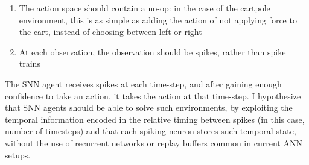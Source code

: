 \documentclass[fyp]{socreport}
\begin{document}
\begin{enumerate}
  \item The action space should contain a no-op: in the case of the cartpole
  environment, this is as simple as adding the action of not applying force to
  the cart, instead of choosing between left or right
\item At each observation, the observation should be spikes, rather than spike
trains
\end{enumerate}

The SNN agent receives spikes at each time-step, and after gaining enough
confidence to take an action, it takes the action at that time-step. I
hypothesize that SNN agents should be able to solve such environments, by
exploiting the temporal information encoded in the relative timing between
spikes (in this case, number of timesteps) and that each spiking neuron stores
such temporal state, without the use of recurrent networks or replay buffers
common in current ANN setups.

\printbibliography

\appendix
\end{document}

